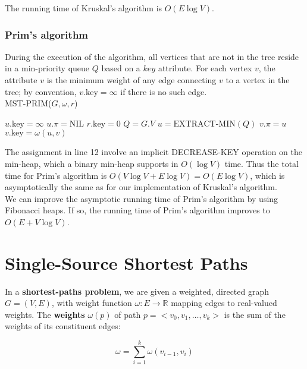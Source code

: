 \documentclass[12pt]{article}
\begin{document}
The running time of Kruskal's algorithm is $O(E \log V)$. \\

\subsubsection*{Prim's algorithm}

During the execution of the algorithm, all vertices that are not in the tree reside in a min-priority queue $Q$ based on a $key$ attribute. For each vertex $v$, the attribute $v$ is the minimum weight of any edge connecting $v$ to a vertex in the tree; by convention, $v.\text{key} = \infty$ if there is no such edge. \\

MST-PRIM($G, \omega, r$)
\begin{algorithmic} [1]
	\State $u.\text{key} = \infty$
        \State $u.\pi = \text{NIL}$
\EndFor
\State $r.\text{key} = 0$
\State $Q = G.V$
	\State $u = \text{EXTRACT-MIN}(Q)$
			\State $v.\pi = u$
                        \State $v.\text{key} = \omega(u,v)$
                \EndIf
        \EndFor
\EndWhile
\end{algorithmic}

The assignment in line 12 involve an implicit DECREASE-KEY operation on the min-heap, which a binary min-heap supports in $O(\log V)$ time. Thus the total time for Prim's algorithm is $O(V \log V + E \log V) = O(E \log V)$, which is asymptotically the same as for our implementation of Kruskal's algorithm. \\

We can improve the asymptotic running time of Prim's algorithm by using Fibonacci heaps. If so, the running time of Prim's algorithm improves to $O(E + V \log V)$.

\section{Single-Source Shortest Paths}

In a \textbf{shortest-paths problem}, we are given a weighted, directed graph $G = (V,E)$, with weight function $\omega : E \rightarrow \mathbb{R}$ mapping edges to real-valued weights. The \textbf{weights} $\omega(p)$ of path $p = <v_0, v_1, \dots, v_k>$ is the sum of the weights of its constituent edges:

\begin{equation*}
  \omega = \sum_{i=1}^k \omega (v_{i-1}, v_i)
\end{equation*}
\end{document}
